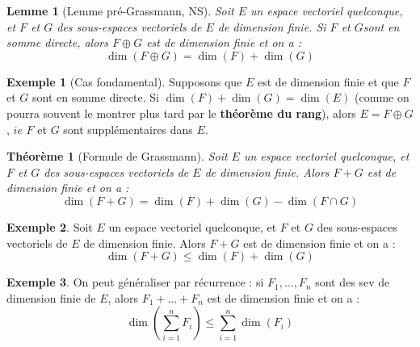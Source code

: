 \documentclass[french]{book}
\theoremstyle{plain}
\newtheorem{thm}{Théorème}[chapter]
\newtheorem{lem}{Lemme}[chapter]
\theoremstyle{definition}
\newtheorem{exa}{Exemple}[chapter]
\theoremstyle{remark}
\begin{document}
\begin{lem}[Lemme pré-Grassmann, NS]
	Soit $E$ un espace vectoriel quelconque, et $F$ et $G$ des sous-espaces vectoriels de $E$ de dimension finie. Si $F$ et $G$sont en somme directe, alors $F\oplus G$ est de dimension finie et on a : $$\dim(F\oplus G)=\dim(F)+\dim(G)$$
\end{lem}
\begin{exa}[Cas fondamental]
	Supposons que $E$ est de dimension finie et que $F$ et $G$ sont en somme directe. Si $\dim(F)+\dim(G)=\dim(E)$ (comme on pourra souvent le montrer plus tard par le \textbf{théorème du rang}), alors $E=F\oplus G$, $ie$ $F$ et $G$ sont supplémentaires dans $E$.
\end{exa}
\begin{thm}[Formule de Grassmann]
	Soit $E$ un espace vectoriel quelconque, et $F$ et $G$ des sous-espaces vectoriels de $E$ de dimension finie. Alors $F+G$ est de dimension finie et on a : $$\dim(F+G)=\dim(F)+\dim(G)-\dim(F\cap G)$$
\end{thm}
\begin{exa}
	Soit $E$ un espace vectoriel quelconque, et $F$ et $G$ des sous-espaces vectoriels de $E$ de dimension finie. Alors $F+G$ est de dimension finie et on a : $$\dim(F+G)\leqslant\dim(F)+\dim(G)$$
\end{exa}
\begin{exa}
	On peut généraliser par récurrence : si $F_1,\dots,F_n$ sont des sev de dimension finie de $E$, alors $F_1+\ldots+F_n$ est de dimension finie et on a : $$\dim\left(\sum_{i=1}^{n}F_i\right)\leqslant\sum_{i=1}^{n}\dim(F_i)$$
\end{exa}
\end{document}
